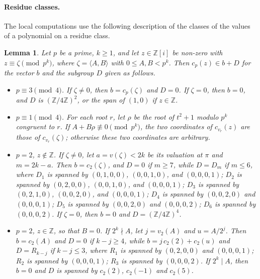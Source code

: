 \documentclass[11pt]{article}
\newtheorem{lemma}[theorem]{Lemma}
\newcommand{\Z}{\mathbb{Z}}
\begin{document}
\paragraph{Residue classes.} The local computations use the following description of the classes of the values of a polynomial on a residue class.

\begin{lemma}\label{lem:residue}
Let $p$ be a prime, $k\geq1$, and let $z\in\Z[i]$ be non-zero with $z\equiv\zeta\pmod{p^k}$, where $\zeta=\langle A,B\rangle$ with $0\leq A,B<p^k$. Then $c_p(z)\in b+D$ for the vector $b$ and the subgroup $D$ given as follows.
\begin{itemize}
\item[(i)] $p\equiv3\pmod4$. If $\zeta\neq0$, then $b=c_p(\zeta)$ and $D=0$. If $\zeta=0$, then $b=0$, and $D$ is $(\Z/4\Z)^2$, or the span of $(1,0)$ if $z\in\Z$.
\item[(ii)] $p\equiv1\pmod4$. For each root $r$, let $\rho$ be the root of $t^2+1$ modulo $p^k$ congruent to $r$. If $A+B\rho\not\equiv0\pmod{p^k}$, the two coordinates of $c_{v_r}(z)$ are those of $c_{v_r}(\zeta)$; otherwise these two coordinates are arbitrary.
\item[(iii)] $p=2$, $z\notin\Z$. If $\zeta\neq0$, let $a=v(\zeta)<2k$ be its valuation at $\pi$ and $m=2k-a$. Then $b=c_2(\zeta)$, and $D=0$ if $m\geq7$, while $D=D_m$ if $m\leq6$, where $D_1$ is spanned by $(0,1,0,0)$, $(0,0,1,0)$, and $(0,0,0,1)$; $D_2$ is spanned by $(0,2,0,0)$, $(0,0,1,0)$, and $(0,0,0,1)$; $D_3$ is spanned by $(0,2,1,0)$, $(0,0,2,0)$, and $(0,0,0,1)$; $D_4$ is spanned by $(0,0,2,0)$ and $(0,0,0,1)$; $D_5$ is spanned by $(0,0,2,0)$ and $(0,0,0,2)$; $D_6$ is spanned by $(0,0,0,2)$. If $\zeta=0$, then $b=0$ and $D=(\Z/4\Z)^4$.
\item[(iv)] $p=2$, $z\in\Z$, so that $B=0$. If $2^k\nmid A$, let $j=v_2(A)$ and $u=A/2^j$. Then $b=c_2(A)$ and $D=0$ if $k-j\geq4$, while $b=j\,c_2(2)+c_2(u)$ and $D=R_{k-j}$ if $k-j\leq3$, where $R_1$ is spanned by $(0,2,0,0)$ and $(0,0,0,1)$; $R_2$ is spanned by $(0,0,0,1)$; $R_3$ is spanned by $(0,0,0,2)$. If $2^k\mid A$, then $b=0$ and $D$ is spanned by $c_2(2)$, $c_2(-1)$ and $c_2(5)$.
\end{itemize}
\end{lemma}
\end{document}
